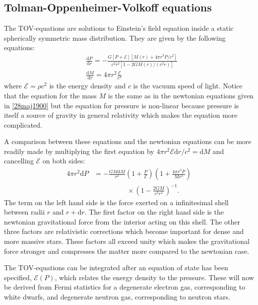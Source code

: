 \documentclass[twocolumn]{article}
\begin{document}
\begin{large}
\subsection*{Tolman-Oppenheimer-Volkoff equations}
The TOV-equations are solutions to Einstein's field equation inside a static spherically symmetric mass distribution. They are given by the following equations:
\begin{equation}
    \begin{split}
        &\frac{\text{d}P}{\text{d}r} = -\frac{G\left[P+\mathcal{E}\right]\left[M(r)+4\pi r^3P/c^2\right]}{c^2r^2[1-2GM(r)/(c^2r)]} \\ 
        &\frac{\text{d}M}{\text{d}r} = 4\pi r^2\frac{\mathcal{E}}{c^2}
    \end{split}
\end{equation}
where $\mathcal{E} = \rho c^2$ is the energy density and $c$ is the vacuum speed of light. Notice that the equation for the mass $M$ is the same as in the newtonian equations given in \eqref{28maj1900} but the equation for pressure is non-linear because pressure is itself a source of gravity in general relativity which makes the equation more complicated.

A comparison between these equations and the newtonian equations can be more readily made by multiplying the first equation by $4\pi r^2\mathcal{E}\text{d}r/c^2 = \text{d}M$ and cancelling $\mathcal{E}$ on both sides:
\begin{equation}
    \label{28maj1039}
    \begin{split}
        4\pi r^2\text{d}P &= -\frac{GM\text{d}M}{r^2}\left(1+\frac{P}{\mathcal{E}}\right)\left(1+\frac{4\pi r^3P}{Mc^2}\right) \\ 
        &\hspace{2cm}\times\left(1-\frac{2GM}{c^2r^2}\right)^{-1}.
    \end{split}
\end{equation}
The term on the left hand side is the force exerted on a infinitesimal shell between radii $r$ and $r+\text{d}r$. The first factor on the right hand side is the newtonian gravitational force from the interior acting on this shell. The other three factors are relativistic corrections which become important for dense and more massive stars. These factors all exceed unity which makes the gravitational force stronger and compresses the matter more compared to the newtonian case.

The TOV-equations can be integrated after an equation of state has been specified, $\mathcal{E}(P)$, which relates the energy density to the pressure. These will now be derived from Fermi statistics for a degenerate electron gas, corresponding to white dwarfs, and degenerate neutron gas, corresponding to neutron stars.


\end{large}
\end{document}
